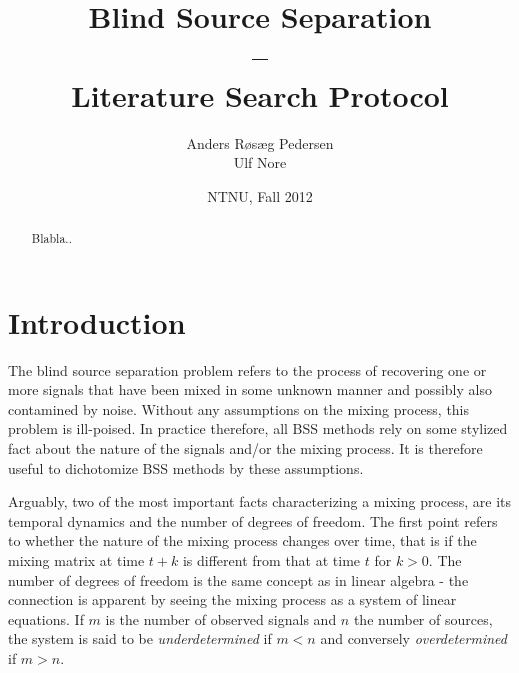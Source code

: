 \documentclass[11pt, oneside, a4paper]{article}
\begin{document}

\title{Blind Source Separation\\--\\Literature Search Protocol}
\author{Anders Røsæg Pedersen\\Ulf Nore}
\date{NTNU, Fall 2012}    %
\maketitle

\begin{abstract}
Blabla..
\end{abstract}

\tableofcontents

\section{Introduction}

The blind source separation problem refers to the process of recovering one or more signals that have been mixed in some unknown manner and possibly also contamined by noise. Without any assumptions on the mixing process, this problem is ill-poised. In practice therefore, all BSS methods rely on some stylized fact about the nature of the signals and/or the mixing process. It is therefore useful to dichotomize BSS methods by these assumptions.

Arguably, two of the most important facts characterizing a mixing process, are its temporal dynamics and the number of degrees of freedom. The first point refers to whether the nature of the mixing process changes over time, that is if the mixing matrix at time $t+k$ is different from that at time $t$ for $k>0$. The number of degrees of freedom is the same concept as in linear algebra - the connection is apparent by seeing the mixing process as a system of linear equations. If $m$ is the number of observed signals and $n$ the number of sources, the system is said to be \emph{underdetermined} if $m<n$ and conversely \emph{overdetermined} if $m>n$. 
\end{document}
